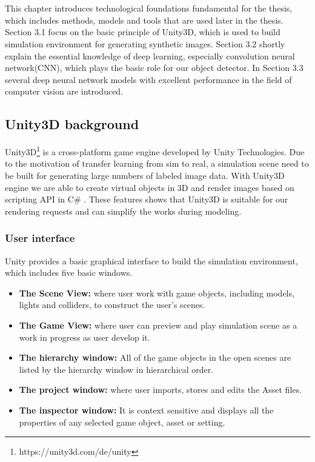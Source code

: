 \chapter{}
\label{sec:Technogical Fundations}
This chapter introduces technological foundations fundamental for the thesis, which includes methods, models and tools that are used later in the thesis. Section 3.1 focus on the basic principle of Unity3D, which is used to build simulation environment for generating synthetic images. Section 3.2 shortly explain the essential knowledge of deep learning, especially convolution neural network(CNN), which plays the basic role for our object detector. In Section 3.3 several deep neural network models with excellent performance in the field of computer vision are introduced.

\section{Unity3D background}
Unity3D\footnote{https://unity3d.com/de/unity} is a cross-platform game engine developed by Unity Technologies. Due to the motivation of transfer learning from sim to real, a simulation scene need to be built for generating large numbers of labeled image data. With Unity3D engine we are able to create virtual objects in 3D and render images based on scripting API in C\# . These features shows that Unity3D is suitable for our rendering requests and can simplify the works during modeling. 

\subsection{User interface}
Unity provides a basic graphical interface to build the simulation environment, which includes five basic windows. 
\begin{itemize}
	\item \textbf{The Scene View:} where user work with game objects, including models, lights and colliders, to construct the user's scenes. 
	\item \textbf{The Game View:} where user can preview and play simulation scene as a work in progress as user develop it.
	\item \textbf{The hierarchy window:} All of the game objects in the open scenes are listed by the hierarchy window in hierarchical order.
	\item \textbf{The project window:} where user imports, stores and edits the Asset files. 
	\item \textbf{The inspector window:} It is context sensitive and displays all the properties of any selected game object, asset or setting.
\end{itemize} 

